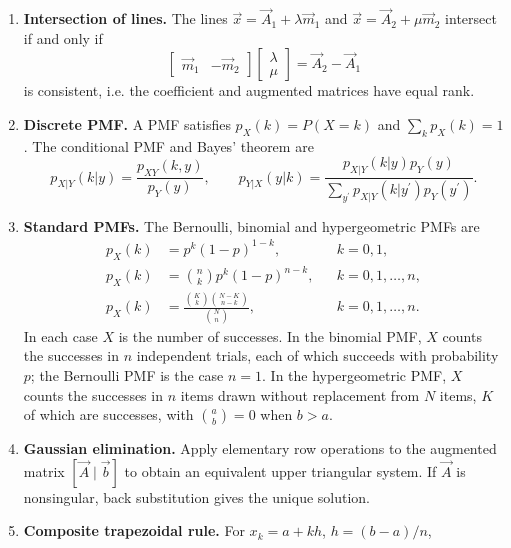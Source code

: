 \begin{enumerate}[label=\normalfont 1.1.\arabic*.,ref=1.1.\arabic*]
\begin{equation*}
\end{equation*}
\item \label{formula-1-1-11} \textbf{Intersection of lines.} The lines $\vec{x}=\vec{A}_1+\lambda\vec{m}_1$ and $\vec{x}=\vec{A}_2+\mu\vec{m}_2$ intersect if and only if
\begin{equation*}\tag{1.1.11.1}
\begin{bmatrix}\vec{m}_1&-\vec{m}_2\end{bmatrix}\begin{bmatrix}\lambda\\\mu\end{bmatrix}=\vec{A}_2-\vec{A}_1
\end{equation*}
is consistent, i.e. the coefficient and augmented matrices have equal rank.
\item \label{formula-1-1-12} \textbf{Discrete PMF.} A PMF satisfies $p_X(k)=P(X=k)$ and $\sum_kp_X(k)=1$. The conditional PMF and Bayes' theorem are
\begin{equation*}\tag{1.1.12.1}
p_{X|Y}(k|y)=\frac{p_{XY}(k,y)}{p_Y(y)},\qquad
p_{Y|X}(y|k)=\frac{p_{X|Y}(k|y)p_Y(y)}{\sum_{y^{\prime}}p_{X|Y}(k|y^{\prime})p_Y(y^{\prime})}.
\end{equation*}
\item \label{formula-1-1-13} \textbf{Standard PMFs.} The Bernoulli, binomial and hypergeometric PMFs are
\begin{equation*}\tag{1.1.13.1}
\begin{aligned}
p_X(k)&=p^k(1-p)^{1-k},&&k=0,1,\\
p_X(k)&=\binom{n}{k}p^k(1-p)^{n-k},&&k=0,1,\ldots,n,\\
p_X(k)&=\frac{\binom{K}{k}\binom{N-K}{n-k}}{\binom{N}{n}},&&k=0,1,\ldots,n.
\end{aligned}
\end{equation*}
In each case $X$ is the number of successes. In the binomial PMF, $X$ counts the successes in $n$ independent trials, each of which succeeds with probability $p$; the Bernoulli PMF is the case $n=1$. In the hypergeometric PMF, $X$ counts the successes in $n$ items drawn without replacement from $N$ items, $K$ of which are successes, with $\binom{a}{b}=0$ when $b>a$.
\item \label{formula-1-1-14} \textbf{Gaussian elimination.} Apply elementary row operations to the augmented matrix $[\vec{A}\mid\vec{b}]$ to obtain an equivalent upper triangular system. If $\vec{A}$ is nonsingular, back substitution gives the unique solution.
\item \label{formula-1-1-15} \textbf{Composite trapezoidal rule.} For $x_k=a+kh$, $h=(b-a)/n$,

\end{enumerate}
